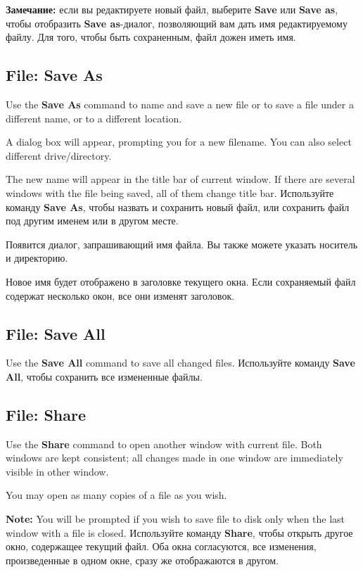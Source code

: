 {\bf Замечание: } если вы редактируете новый файл, выберите {\bf Save} или 
{\bf Save as}, чтобы отобразить {\bf Save as}-диалог, позволяющий вам дать имя
редактируемому файлу. Для того, чтобы быть сохраненным, файл дожен иметь имя. 
\fi

\subsection{File: Save As}

\ifenglish
Use the {\bf Save As} command to name and save a new file
or to save a file under a different name, or to a different location.

A dialog box will appear, prompting you for a new filename. You can
also select different drive/directory.

The new name will appear in the title bar of current window. If there are
several windows with the file being saved, all of them change title bar.
\else
Используйте команду {\bf Save As}, чтобы назвать и сохранить новый файл,
или сохранить файл под другим именем или в другом месте.

Появится диалог, запрашивающий имя файла. Вы также можете указать носитель
и директорию.

Новое имя будет отображено в заголовке текущего окна. Если сохраняемый файл 
содержат несколько окон, все они изменят заголовок.
\fi

\subsection{File: Save All}

\ifenglish
Use the {\bf Save All} command to save all changed files.
\else
Используйте команду {\bf Save All}, чтобы сохранить все измененные файлы.
\fi

\subsection{File: Share}

\ifenglish
Use the {\bf Share} command to open another window with current file.
Both windows are kept consistent; all changes made in one window
are immediately visible in other window.

You may open as many copies of a file as you wish.

{\bf Note:} You will be prompted if you wish to save file to disk only when
the last window with a file is closed.
\else
Используйте команду {\bf Share}, чтобы открыть другое окно, содержащее текущий 
файл. Оба окна согласуются, все изменения, произведенные в одном окне, сразу же
отображаются в другом.  

